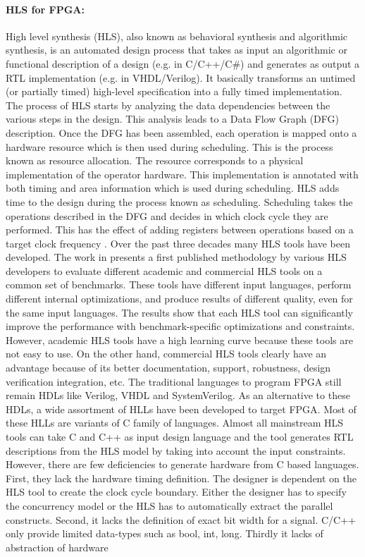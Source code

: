 \paragraph{HLS for FPGA:}
High level synthesis (HLS), also known as behavioral synthesis and algorithmic synthesis, is an automated design process that takes as
input an algorithmic  or functional description of a design (e.g. in C/C++/C#) and generates as output a RTL implementation (e.g. in VHDL/Verilog). It basically transforms an untimed (or partially timed) high-level specification into a fully timed implementation. The process of HLS starts by analyzing the data dependencies between the various steps in the design. This analysis leads to a Data Flow Graph (DFG) description. Once the DFG has been assembled, each operation is mapped onto a hardware resource which is then used during scheduling. This is the process known as resource allocation. The resource corresponds to a physical implementation of the operator hardware. This implementation is annotated with both timing and area information which is used during scheduling. HLS adds time to the design during the process known as scheduling. Scheduling takes the operations described in the DFG and decides in which clock cycle they are performed. This has the effect of adding registers between operations based on a target clock frequency \cite{hlsbluebook}. \newline
Over the past three decades many HLS tools have been developed. The work in \cite{survey_evaluation} presents a first published methodology by various HLS developers to evaluate different academic and commercial HLS tools on a common set of benchmarks. These tools have different input languages, perform different internal optimizations, and produce results of different quality, even for the same input languages. The results show that each HLS tool can significantly improve the performance
with benchmark-specific optimizations and constraints. However, academic HLS tools have a high learning curve because these tools are not easy to use. On the other hand, commercial HLS tools clearly have an advantage because of its better documentation, support, robustness, design verification integration, etc. \newline
The traditional languages to program FPGA still remain HDLs like Verilog, VHDL and SystemVerilog. As an alternative to these HDLs, a wide
assortment of HLLs have been developed to
target FPGA. Most of these HLLs are variants of C family of languages. Almost all mainstream HLS tools can take C and C++ as input design language and the tool generates RTL descriptions from the HLS model by taking into account the input constraints. However, there are few deficiencies to generate hardware from C based languages. First, they lack the hardware timing definition. The designer is dependent on the HLS tool to create the clock cycle boundary. Either the designer has to specify the concurrency model or the HLS has to automatically extract the parallel constructs. Second, it lacks the definition of exact bit width for a signal. C/C++ only provide limited data-types such as bool, int, long. Thirdly it lacks of abstraction of hardware
